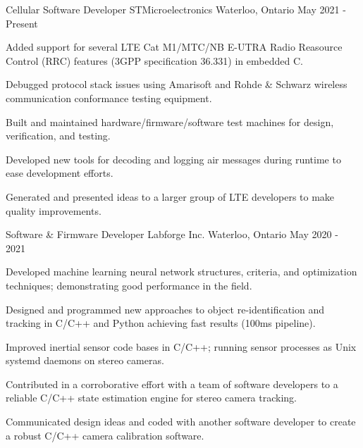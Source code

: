
\begin{cventries}

  \cventry
    {Cellular Software Developer} %
    {STMicroelectronics} %
    {Waterloo, Ontario} %
    {May 2021 - Present} %
    {
      \begin{cvitems} %
        \item {Added support for several LTE Cat M1/MTC/NB E-UTRA Radio Reasource Control (RRC) features (3GPP specification 36.331) in embedded C.}
        \item {Debugged protocol stack issues using Amarisoft and Rohde \& Schwarz wireless communication conformance testing equipment.}
        \item {Built and maintained hardware/firmware/software test machines for design, verification, and testing.}
        \item {Developed new tools for decoding and logging air messages during runtime to ease development efforts.}
        \item {Generated and presented ideas to a larger group of LTE developers to make quality improvements.}
      \end{cvitems}
    }

  \cventry
    {Software \& Firmware Developer} %
    {Labforge Inc.} %
    {Waterloo, Ontario} %
    {May 2020 - 2021} %
    {
      \begin{cvitems} %
        \item {Developed machine learning neural network structures, criteria, and optimization techniques; demonstrating good performance in the field.}
        \item {Designed and programmed new approaches to object re-identification and tracking in C/C++ and Python achieving fast results (100ms pipeline).}
        \item {Improved inertial sensor code bases in C/C++; running sensor processes as Unix systemd daemons on stereo cameras.}
        \item {Contributed in a corroborative effort with a team of software developers to a reliable C/C++ state estimation engine for stereo camera tracking.}
        \item {Communicated design ideas and coded with another software developer to create a robust C/C++ camera calibration software.}
      \end{cvitems}
    }


\end{cventries}
